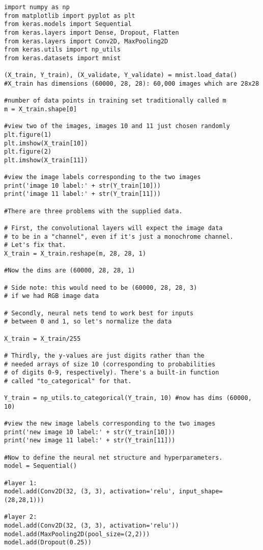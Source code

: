 \begin{lstlisting}
import numpy as np
from matplotlib import pyplot as plt
from keras.models import Sequential
from keras.layers import Dense, Dropout, Flatten
from keras.layers import Conv2D, MaxPooling2D
from keras.utils import np_utils
from keras.datasets import mnist

(X_train, Y_train), (X_validate, Y_validate) = mnist.load_data()
#X_train has dimensions (60000, 28, 28): 60,000 images which are 28x28

#number of data points in training set traditionally called m
m = X_train.shape[0]

#view two of the images, images 10 and 11 just chosen randomly
plt.figure(1)
plt.imshow(X_train[10])
plt.figure(2)
plt.imshow(X_train[11])

#view the image labels corresponding to the two images
print('image 10 label:' + str(Y_train[10]))
print('image 11 label:' + str(Y_train[11]))

#There are three problems with the supplied data.

# First, the convolutional layers will expect the image data
# to be in a "channel", even if it's just a monochrome channel.
# Let's fix that.
X_train = X_train.reshape(m, 28, 28, 1)

#Now the dims are (60000, 28, 28, 1)

# Side note: this would need to be (60000, 28, 28, 3)
# if we had RGB image data

# Secondly, neural nets tend to work best for inputs
# between 0 and 1, so let's normalize the data

X_train = X_train/255

# Thirdly, the y-values are just digits rather than the
# needed arrays of size 10 (corresponding to probabilities
# of digits 0-9, respectively). There's a built-in function
# called "to_categorical" for that.

Y_train = np_utils.to_categorical(Y_train, 10) #now has dims (60000, 10)

#view the new image labels corresponding to the two images
print('new image 10 label:' + str(Y_train[10]))
print('new image 11 label:' + str(Y_train[11]))

#Now to define the neural net structure and hyperparameters.
model = Sequential()

#layer 1:
model.add(Conv2D(32, (3, 3), activation='relu', input_shape=(28,28,1)))

#layer 2:
model.add(Conv2D(32, (3, 3), activation='relu'))
model.add(MaxPooling2D(pool_size=(2,2)))
model.add(Dropout(0.25))


\end{lstlisting}
